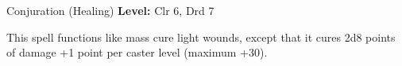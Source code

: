 {Conjuration (Healing)}
{
	\textbf{Level:}
	Clr 6, Drd 7\\
}
{
	This spell functions like mass cure light wounds, except that it cures 2d8 points of damage +1 point per caster level (maximum +30).

}

